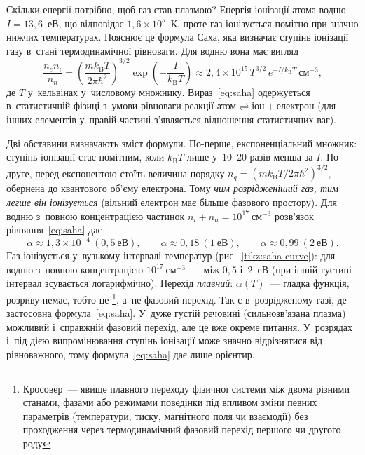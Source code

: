 Скільки енергії потрібно, щоб газ став плазмою? Енергія іонізації атома водню
$I=13{,}6$~еВ, що відповідає $1{,}6\times10^{5}$~К, проте газ іонізується помітно при
значно нижчих температурах. Пояснює це формула Саха, яка визначає ступінь іонізації газу
в~стані термодинамічної рівноваги. Для водню вона має вигляд
\begin{equation}\label{eq:saha}
	\frac{n_e n_i}{n_n} = \left(\frac{m k_{\mathrm B}T}{2\pi\hbar^2}\right)^{3/2}\exp\left(-\frac{I}{k_{\mathrm B}T}\right)
	\approx 2{,}4\times10^{15}\,T^{3/2}\,e^{-I/k_{\mathrm B}T}~\mathrm{см}^{-3},
\end{equation}
де $T$ у~кельвінах у~числовому множнику. Вираз~\eqref{eq:saha} одержується в~статистичній
фізиці з~умови рівноваги реакції $\text{атом}\rightleftharpoons\text{іон}+\text{електрон}$
(для інших елементів у~правій частині з'являється відношення статистичних ваг).

Дві обставини визначають зміст формули. По-перше, експоненціальний множник: ступінь
іонізації стає помітним, коли $k_{\mathrm B}T$ лише у~$10$--$20$ разів менша за $I$.
По-друге, перед експонентою стоїть величина порядку $n_q=(mk_{\mathrm
		B}T/2\pi\hbar^2)^{3/2}$, обернена до квантового об'єму електрона. Тому \emph{чим
	розрідженіший газ, тим легше він іонізується} (вільний електрон має більше фазового
простору). Для водню з~повною концентрацією частинок $n_i+n_n=10^{17}~\mathrm{см}^{-3}$
розв'язок рівняння~\eqref{eq:saha} дає
\begin{equation*}
	\alpha\approx1{,}3\times10^{-4}\ (0{,}5~\text{еВ}),\qquad
	\alpha\approx0{,}18\ (1~\text{еВ}),\qquad
	\alpha\approx0{,}99\ (2~\text{еВ}).
\end{equation*}
Газ іонізується у~вузькому інтервалі температур (рис.~\ref{tikz:saha-curve}): для водню
з~повною концентрацією $10^{17}~\mathrm{см}^{-3}$~--- між $0{,}5$ і~$2$~еВ (при іншій
густині інтервал зсувається логарифмічно). Перехід \emph{плавний}: $\alpha(T)$~--- гладка
функція, розриву немає, тобто це \footnote{Кросовер~--- явище плавного
	переходу фізичної системи між двома різними станами, фазами або режимами поведінки під
	впливом зміни певних параметрів (температури, тиску, магнітного поля чи взаємодії) без
	проходження через термодинамічний фазовий перехід першого чи другого роду}, а~не фазовий
перехід. Так є в~розрідженому газі, де застосовна формула~\eqref{eq:saha}. У~дуже густій
речовині (сильнозв'язана плазма) можливий і~справжній фазовий перехід, але це вже окреме
питання. У~розрядах і~під дією випромінювання ступінь іонізації може значно відрізнятися
від рівноважного, тому формула~\eqref{eq:saha} дає лише орієнтир.


